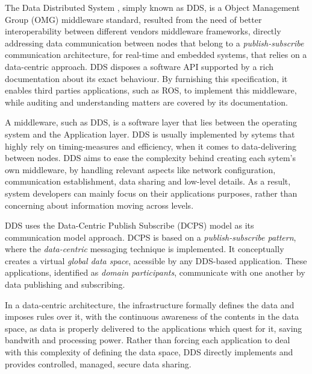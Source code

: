 The Data Distributed System \cite{3}, simply known as DDS, is a Object Management Group (OMG) middleware standard, resulted from the need of better interoperability between different vendors middleware frameworks, directly addressing data communication between nodes that belong to a \textit{publish-subscribe} communication architecture, for real-time and embedded systems, that relies on a data-centric approach. DDS disposes a software API supported by a rich documentation about its exact behaviour. By furnishing this specification, it enables third parties applications, such as ROS, to implement this middleware, while auditing and understanding matters are covered by its documentation.
            
A middleware, such as DDS, is a software layer that lies between the operating system and the Application layer. \cite{dds-what-is} DDS is usually implemented by sytems that highly rely on timing-measures and efficiency, when it comes to data-delivering between nodes. DDS aims to ease the complexity behind creating each sytem's own middleware, by handling relevant aspects like network configuration, communication establishment, data sharing and low-level details. As a result, system developers can mainly focus on their applications purposes, rather than concerning about information moving across levels. 


DDS uses the Data-Centric Publish Subscribe (DCPS) model as its communication model approach. DCPS is based on a \textit{publish-subscribe pattern}, where the \textit{data-centric} messaging technique is implemented. It conceptually creates a virtual \textit{global data space}, acessible by any DDS-based application. These applications, identified as \textit{domain participants}, communicate with one another by data publishing and subscribing. \cite{maruyama2016exploring} 

In a data-centric architecture, the infrastructure formally defines the data and imposes rules over it, with the continuous awareness of the contents in the data space, as data is properly delivered to the applications which quest for it, saving bandwith and processing power. \cite{3} Rather than forcing each application to deal with this complexity of defining the data space, DDS directly implements and provides controlled, managed, secure data sharing. \cite{pardo2005introduction}

